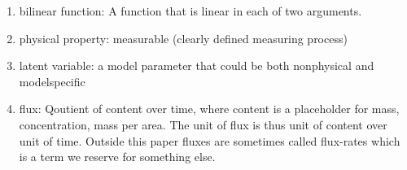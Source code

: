 \begin{enumerate}
\begin{enumerate}
    \begin{enumerate}
    \item
      \label{glossary:bilinear} 
      bilinear function: A function that is linear in each of two arguments.
    \item
      \label{glossary:physProp} 
      physical property: measurable (clearly defined measuring process)
    \item
      \label{glossary:latentVar} 
      latent variable: a model parameter that could be both nonphysical and modelspecific 
    \item
    \label{glossary:flux}
    flux: Qoutient of content over time, where content is a placeholder for mass, concentration, mass per area.
    The unit of flux is thus unit of content over unit of time.
    Outside this paper fluxes are sometimes called flux-rates     which is a term we reserve for something else.
    

\end{enumerate}
\end{enumerate}
\end{enumerate}
